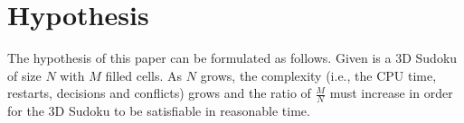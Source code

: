 \section{Hypothesis}

The hypothesis of this paper can be formulated as follows. Given is a 3D Sudoku of size $N$ with $M$ filled cells. As $N$ grows, the complexity (i.e., the CPU time, restarts, decisions and conflicts) grows and the ratio of $\frac{M}{N}$ must increase in order for the 3D Sudoku to be satisfiable in reasonable time.